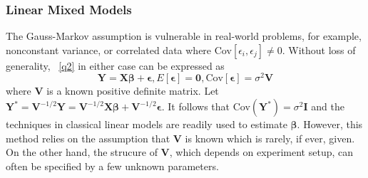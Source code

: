 	\subsubsection{Linear Mixed Models}
	The Gauss-Markov assumption is vulnerable in real-world problems, for example, nonconstant variance, or correlated data where Cov$[\epsilon_i, \epsilon_j]\neq 0$. Without loss of generality, ~\ref{q2} in either case can be expressed as
		\begin{equation}\label{lm}
			\bm Y = \bm {X\beta} + \bm \epsilon,  E[\bm \epsilon] = \bm 0, \text{Cov}[\bm\epsilon] = \sigma^2 \bm V
		\end{equation}
	where $\bm V$ is a known positive definite matrix. Let $\bm Y^{\ast} = \bm V^{-1/2}\bm Y = \bm V^{-1/2}\bm {X\beta} + \bm V^{-1/2}\bm \epsilon$. It follows that Cov$(\bm Y^{\ast})= \sigma^2 \bm I$ and the techniques in classical linear models are readily used to estimate $\bm \beta$. However, this method relies on the assumption that $\bm V$ is known which is rarely, if ever, given. On the other hand, the strucure of $\bm V$, which depends on experiment setup, can often be specified by a few unknown parameters. 

